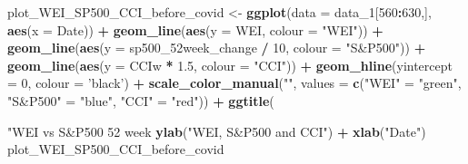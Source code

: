 \documentclass[]{article}
\newenvironment{Shaded}{\begin{snugshade}}{\end{snugshade}}
\newcommand{\KeywordTok}[1]{\textcolor[rgb]{0.13,0.29,0.53}{\textbf{#1}}}
\newcommand{\DataTypeTok}[1]{\textcolor[rgb]{0.13,0.29,0.53}{#1}}
\newcommand{\DecValTok}[1]{\textcolor[rgb]{0.00,0.00,0.81}{#1}}
\newcommand{\FloatTok}[1]{\textcolor[rgb]{0.00,0.00,0.81}{#1}}
\newcommand{\StringTok}[1]{\textcolor[rgb]{0.31,0.60,0.02}{#1}}
\newcommand{\OperatorTok}[1]{\textcolor[rgb]{0.81,0.36,0.00}{\textbf{#1}}}
\newcommand{\NormalTok}[1]{#1}
\begin{document}
\begin{Shaded}
\begin{Highlighting}[]
{{\NormalTok{plot_WEI_SP500_CCI_before_covid <-}\StringTok{ }\KeywordTok{ggplot}\NormalTok{(}\DataTypeTok{data =}\NormalTok{ data_}\DecValTok{1}\NormalTok{[}\DecValTok{560}\OperatorTok{:}\DecValTok{630}\NormalTok{,], }\KeywordTok{aes}\NormalTok{(}\DataTypeTok{x =}\NormalTok{ Date)) }\OperatorTok{+}
\StringTok{  }\KeywordTok{geom_line}\NormalTok{(}\KeywordTok{aes}\NormalTok{(}\DataTypeTok{y =}\NormalTok{ WEI, }\DataTypeTok{colour =} \StringTok{"WEI"}\NormalTok{)) }\OperatorTok{+}\StringTok{ }
\StringTok{  }\KeywordTok{geom_line}\NormalTok{(}\KeywordTok{aes}\NormalTok{(}\DataTypeTok{y =}\NormalTok{ sp500_52week_change }\OperatorTok{/}\StringTok{ }\DecValTok{10}\NormalTok{, }\DataTypeTok{colour =} \StringTok{"S&P500"}\NormalTok{)) }\OperatorTok{+}
\StringTok{  }\KeywordTok{geom_line}\NormalTok{(}\KeywordTok{aes}\NormalTok{(}\DataTypeTok{y =}\NormalTok{ CCIw }\OperatorTok{*}\StringTok{ }\FloatTok{1.5}\NormalTok{, }\DataTypeTok{colour =} \StringTok{"CCI"}\NormalTok{)) }\OperatorTok{+}
\StringTok{  }\KeywordTok{geom_hline}\NormalTok{(}\DataTypeTok{yintercept =} \DecValTok{0}\NormalTok{, }\DataTypeTok{colour =} \StringTok{'black'}\NormalTok{) }\OperatorTok{+}
\StringTok{  }\KeywordTok{scale_color_manual}\NormalTok{(}\StringTok{""}\NormalTok{, }\DataTypeTok{values =} \KeywordTok{c}\NormalTok{(}\StringTok{"WEI"}\NormalTok{ =}\StringTok{ "green"}\NormalTok{, }\StringTok{"S&P500"}\NormalTok{ =}\StringTok{ "blue"}\NormalTok{, }\StringTok{"CCI"}\NormalTok{ =}\StringTok{ "red"}\NormalTok{)) }\OperatorTok{+}\StringTok{ }
\StringTok{  }\KeywordTok{ggtitle}\NormalTok{(}\StringTok{"WEI vs S&P500 52 week % change scaled by 10 vs CCI scaled by 1.5 before covid"}\NormalTok{) }\OperatorTok{+}\StringTok{ }
\StringTok{  }\KeywordTok{ylab}\NormalTok{(}\StringTok{"WEI, S&P500 and CCI"}\NormalTok{) }\OperatorTok{+}\StringTok{ }
\StringTok{  }\KeywordTok{xlab}\NormalTok{(}\StringTok{"Date"}\NormalTok{) }
\NormalTok{plot_WEI_SP500_CCI_before_covid}

}}}
\end{Highlighting}
\end{Shaded}
\end{document}
